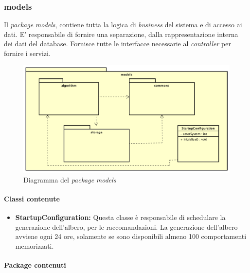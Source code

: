 \subsubsection{models}
Il \emph{package} \emph{models}, contiene tutta la logica di \emph{business} del sistema e di accesso ai dati. E' responsabile di fornire una separazione, dalla rappresentazione interna dei dati del database. Fornisce tutte le interfacce necessarie al \emph{controller} per fornire i servizi.
\begin{figure}[h]
\centering
\includegraphics[scale=0.30]{immagini/models}
\caption{Diagramma del \emph{package} \emph{models}}
\label{fig:pack-models}
\end{figure}
\paragraph{Classi contenute}
\begin{itemize}
\item \textbf{StartupConfiguration:} Questa classe è responsabile di schedulare la generazione dell'albero, per le raccomandazioni. La generazione dell'albero avviene ogni 24 ore, solamente se sono disponibili almeno 100 comportamenti memorizzati.
\end{itemize}
\paragraph{Package contenuti}
